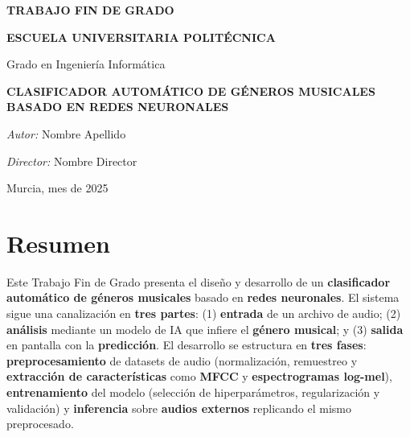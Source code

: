 \documentclass[12pt,twoside]{article}
\newcommand{\PortadaUCAM}{
\begin{titlepage}
    \centering
    {\Large \textbf{TRABAJO FIN DE GRADO}\par}
    \vspace{0.8cm}
    {\large \textbf{ESCUELA UNIVERSITARIA POLITÉCNICA}\par}
    {\normalsize Grado en Ingeniería Informática\par}
    \vspace{1.4cm}
    {\Large \textbf{CLASIFICADOR AUTOMÁTICO DE GÉNEROS MUSICALES}\\[0.4em]
     \textbf{BASADO EN REDES NEURONALES}\par}
    \vfill
    {\normalsize \textit{Autor:} Nombre Apellido\par}      %
    {\normalsize \textit{Director:} Nombre Director\par}    %
    \vspace{0.6cm}
    {\normalsize Murcia, mes de 2025\par}                   %
\end{titlepage}
}
\begin{document}
\PortadaUCAM



\section*{Resumen}
Este Trabajo Fin de Grado presenta el diseño y desarrollo de un \textbf{clasificador automático de géneros musicales} basado en \textbf{redes neuronales}. El sistema sigue una canalización en \textbf{tres partes}: (1) \textbf{entrada} de un archivo de audio; (2) \textbf{análisis} mediante un modelo de IA que infiere el \textbf{género musical}; y (3) \textbf{salida} en pantalla con la \textbf{predicción}. El desarrollo se estructura en \textbf{tres fases}: \textbf{preprocesamiento} de datasets de audio (normalización, remuestreo y \textbf{extracción de características} como \textbf{MFCC} y \textbf{espectrogramas log-mel}), \textbf{entrenamiento} del modelo (selección de hiperparámetros, regularización y validación) y \textbf{inferencia} sobre \textbf{audios externos} replicando el mismo preprocesado.
\end{document}
